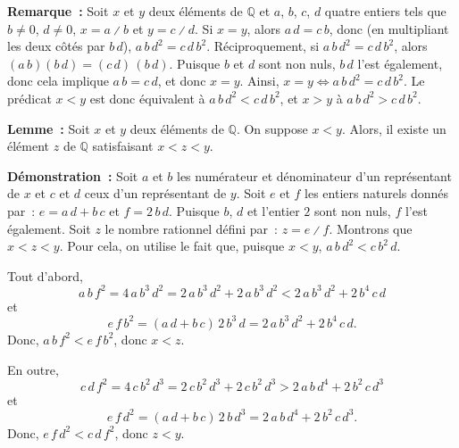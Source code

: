 \medskip

\noindent\textbf{Remarque :}
    Soit $x$ et $y$ deux éléments de $\mathbb{Q}$ et $a$, $b$, $c$, $d$ quatre entiers tels que $b \neq 0$, $d \neq 0$, $x = a \divslash b$ et $y = c \divslash d$.
    Si $x = y$, alors $a \, d = c \, b$, donc (en multipliant les deux côtés par $b \, d$), $a \, b \, d^2 = c \, d \, b^2$.
    Réciproquement, si $a \, b \, d^2 = c \, d \, b^2$, alors $(a \, b) (b \, d) = (c \, d) \, (b \, d)$.
    Puisque $b$ et $d$ sont non nuls, $b \, d$ l'est également, donc cela implique $a \, b = c \, d$, et donc $x = y$.
    Ainsi, $x = y \Leftrightarrow a \, b \, d^2 = c \, d \, b^2$.
    Le prédicat $x < y$ est donc équivalent à $a \, b \, d^2 < c \, d \, b^2$, et $x > y$ à $a \, b \, d^2 > c \, d \, b^2$.

\medskip

\noindent\textbf{Lemme :} Soit $x$ et $y$ deux éléments de $\mathbb{Q}$. 
    On suppose $x < y$. 
    Alors, il existe un élément $z$ de $\mathbb{Q}$ satisfaisant $x < z < y$. 

\medskip

\noindent\textbf{Démonstration :} Soit $a$ et $b$ les numérateur et dénominateur d'un représentant de $x$ et $c$ et $d$ ceux d'un représentant de $y$. 
    Soit $e$ et $f$ les entiers naturels donnés par : $e = a \, d + b \, c$ et $f = 2 \, b \, d$.
    Puisque $b$, $d$ et l'entier $2$ sont non nuls, $f$ l'est également.
    Soit $z$ le nombre rationnel défini par : $z = e \divslash f$.
    Montrons que $x < z < y$. 
    Pour cela, on utilise le fait que, puisque $x < y$, $a \, b \, d^2 < c \, b^2 \, d$.

    Tout d'abord, 
    \begin{equation*}
        a \, b \, f^2 
        = 4 \, a \, b^3 \, d^2
        = 2 \, a \, b^3 \, d^2 + 2 \, a \, b^3 \, d^2
        < 2 \, a \, b^3 \, d^2 + 2 \, b^4 \, c \, d 
    \end{equation*}
    et 
    \begin{equation*}
        e \, f \, b^2
        = (a \, d + b \, c) \, 2 \, b^3 \, d
        = 2 \, a \, b^3 \, d^2 + 2 \, b^4 \, c \, d. 
    \end{equation*}
    Donc, $a \, b \, f^2 < e \, f \, b^2$, donc $x < z$.

    En outre, 
    \begin{equation*}
        c \, d \, f^2 
        = 4 \, c \, b^2 \, d^3
        = 2 \, c \, b^2 \, d^3 + 2 \, c \, b^2 \, d^3
        > 2 \, a \, b \, d^4 + 2 \, b^2 \, c \, d^3 
    \end{equation*}
    et 
    \begin{equation*}
        e \, f \, d^2
        = (a \, d + b \, c) \, 2 \, b \, d^3
        = 2 \, a \, b \, d^4 + 2 \, b^2 \, c \, d^3. 
    \end{equation*}
    Donc, $e \, f \, d^2 < c \, d \, f^2$, donc $z < y$.

